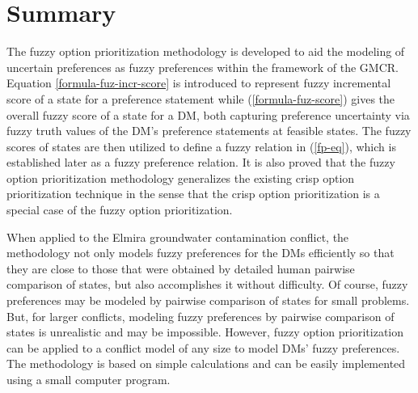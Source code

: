 \section{Summary}

The fuzzy option prioritization methodology is developed to aid the modeling of uncertain preferences as fuzzy preferences within the framework of the GMCR. Equation \ref{formula-fuz-incr-score} is introduced to represent fuzzy incremental score of a state for a preference statement while (\ref{formula-fuz-score}) gives the overall fuzzy score of a state for a DM, both capturing preference uncertainty via fuzzy truth values of the DM's preference statements at feasible states. The fuzzy scores of states are then utilized to define a fuzzy relation in (\ref{fp-eq}), which is established later as a fuzzy preference relation. It is also proved that the fuzzy option prioritization methodology generalizes the existing crisp option prioritization technique in the sense that the crisp option prioritization is a special case of the fuzzy option prioritization.

When applied to the Elmira groundwater contamination conflict, the methodology not only models fuzzy preferences for the DMs efficiently so that they are close to those that were obtained by detailed human pairwise comparison of states, but also accomplishes it without difficulty. Of course, fuzzy preferences may be modeled by pairwise comparison of states for small problems. But, for larger conflicts, modeling fuzzy preferences by pairwise comparison of states is unrealistic and may be impossible. However, fuzzy option prioritization can be applied to a conflict model of any size to model DMs' fuzzy preferences. The methodology is based on simple calculations and can be easily implemented using a small computer program.
